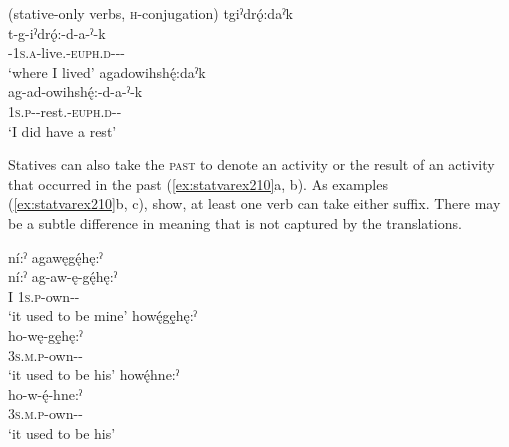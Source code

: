 \newpage
\ea\label{ex:statvarex21}   (stative-only verbs, \textsc{h}-conjugation)
\ea tgiˀdrǫ́:daˀk\\
\gll t-g-iˀdrǫ́:-d-a-ˀ-k\\
 {\cislocative}-\textsc{1s.a}-live.{\stative}-\textsc{euph.d}-{\joinerA}-{\causative}-\\
\glt `where I lived'
\ex agadowihshę́:daˀk\\
\gll ag-ad-owihshę́:-d-a-ˀ-k\\
 \textsc{1s.p}-{\semireflexive}-rest.{\stative}-\textsc{euph.d}-{\causative}-\\
\glt `I did have a rest'
\z
\z

Statives can also take the  \textsc{past }to denote an activity or the result of an activity that occurred in the past (\ref{ex:statvarex210}a, b). As examples (\ref{ex:statvarex210}b, c), show, at least one verb can take either suffix. There may be a subtle difference in meaning that is not captured by the translations.

\ea\label{ex:statvarex210} 
\ea ní:ˀ agawęgę́hę:ˀ\\\label{ex:statvarex210a}
\gll ní:ˀ ag-aw-ę-gę́hę:ˀ\\
 I \textsc{1s.p}-own-{\stative}-{\past}\\
\glt  ‘it used to be mine’
\ex howę́gę̱hę:ˀ\\\label{ex:statvarex210b}
\gll ho-wę-gę̱hę:ˀ\\
 \textsc{3s.m.p}-own-{\stative}-{\past}\\
\glt `it used to be his'
\ex howę́hne:ˀ\\\label{ex:statvarex210c}
\gll ho-w-ę́-hne:ˀ\\
 \textsc{3s.m.p}-own-{\stative}-{\remote}\\
\glt `it used to be his'
\z
\z



